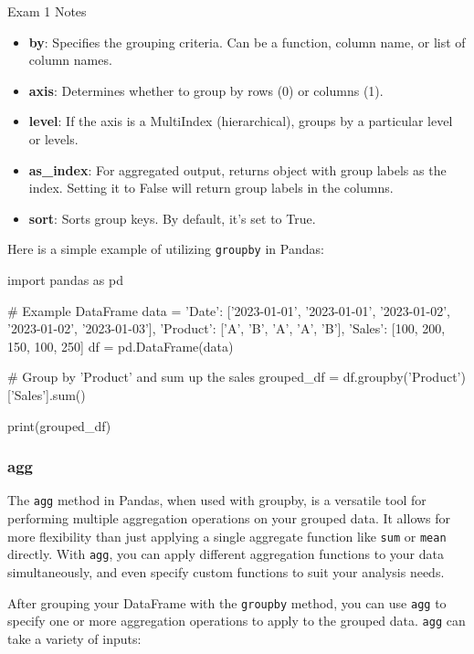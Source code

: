 \begin{examnotes}{Exam 1 Notes}
    \begin{itemize}
        \item \textbf{by}: Specifies the grouping criteria. Can be a function, column name, or list of column names.
        \item \textbf{axis}: Determines whether to group by rows (0) or columns (1).
        \item \textbf{level}: If the axis is a MultiIndex (hierarchical), groups by a particular level or levels.
        \item \textbf{as\_index}: For aggregated output, returns object with group labels as the index. Setting it to False will return group labels in the columns.
        \item \textbf{sort}: Sorts group keys. By default, it's set to True.
    \end{itemize}

    \begin{highlight}
        Here is a simple example of utilizing \texttt{groupby} in Pandas:

    \begin{code}[Python]
    import pandas as pd

    # Example DataFrame
    data = {
        'Date': ['2023-01-01', '2023-01-01', '2023-01-02', '2023-01-02', '2023-01-03'],
        'Product': ['A', 'B', 'A', 'A', 'B'],
        'Sales': [100, 200, 150, 100, 250]
    }
    df = pd.DataFrame(data)
    
    # Group by 'Product' and sum up the sales
    grouped_df = df.groupby('Product')['Sales'].sum()
    
    print(grouped_df)            
    \end{code}
    \end{highlight}

    \subsubsection*{agg}

    The \texttt{agg} method in Pandas, when used with groupby, is a versatile tool for performing multiple aggregation operations on your grouped data. It allows for more flexibility than just applying 
    a single aggregate function like \texttt{sum} or \texttt{mean} directly. With \texttt{agg}, you can apply different aggregation functions to your data simultaneously, and even specify custom functions 
    to suit your analysis needs.

    After grouping your DataFrame with the \texttt{groupby} method, you can use \texttt{agg} to specify one or more aggregation operations to apply to the grouped data. \texttt{agg} can take a variety 
    of inputs:


\end{examnotes}
